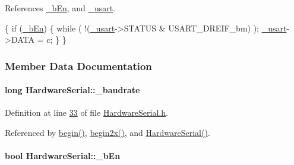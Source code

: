 References \hyperlink{_hardware_serial_8h_source_l00034}{\_\-bEn}, and \hyperlink{_hardware_serial_8h_source_l00027}{\_\-usart}.


\begin{DoxyCode}
\{
    \textcolor{keywordflow}{if} (\hyperlink{class_hardware_serial_a8040fbab1f9197a9935df23a4c5e9a3b}{_bEn}) \{
        \textcolor{keywordflow}{while} ( !(\hyperlink{class_hardware_serial_a3a3bd56aa561ae7e1eb1fd252b5b69a0}{_usart}->STATUS & USART\_DREIF\_bm) );
        \hyperlink{class_hardware_serial_a3a3bd56aa561ae7e1eb1fd252b5b69a0}{_usart}->DATA = c;
    \}
\}
\end{DoxyCode}


\subsubsection{Member Data Documentation}
\hypertarget{class_hardware_serial_ae692ab4a0a8aad73c74a10066fa9da24}{
\paragraph[{\_\-baudrate}]{\setlength{\rightskip}{0pt plus 5cm}long {\bf HardwareSerial::\_\-baudrate}}\hfill}
\label{class_hardware_serial_ae692ab4a0a8aad73c74a10066fa9da24}


Definition at line \hyperlink{_hardware_serial_8h_source_l00033}{33} of file \hyperlink{_hardware_serial_8h_source}{HardwareSerial.h}.



Referenced by \hyperlink{_hardware_serial_8cpp_source_l00140}{begin()}, \hyperlink{_hardware_serial_8cpp_source_l00173}{begin2x()}, and \hyperlink{_hardware_serial_8cpp_source_l00112}{HardwareSerial()}.

\hypertarget{class_hardware_serial_a8040fbab1f9197a9935df23a4c5e9a3b}{
\paragraph[{\_\-bEn}]{\setlength{\rightskip}{0pt plus 5cm}bool {\bf HardwareSerial::\_\-bEn}}\hfill}
\label{class_hardware_serial_a8040fbab1f9197a9935df23a4c5e9a3b}


